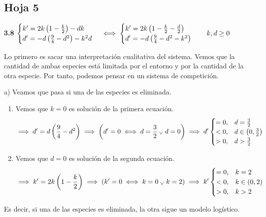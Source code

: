 \begin{center}
\end{center}

\subsection{Hoja 5}

\textbf{3.8} $\displaystyle \begin{cases}
		k' = 2k\left(1-\frac{k}{2}\right) - dk \\
		d' = -d\left(\frac{9}{4} - d^2\right) -k^2d
	\end{cases} \iff \begin{cases}
		k' = 2k\left(1-\frac{k}{2} - \frac{d}{2}\right) \\
		d' = -d\left(\frac{9}{4} - d^2 - k^2\right)
	\end{cases} \quad k,d \geq 0$

Lo primero es sacar una interpretación cualitativa del sistema. Vemos que la cantidad de ambas especies está limitada por el entorno y por la cantidad de la otra especie. Por tanto, podemos pensar en un sistema de competición.

a) Veamos que pasa si una de las especies es eliminada.
\begin{enumerate}
	\item Vemos que $k=0$ es solución de la primera ecuación.
	      \[\implies d'=d\left(\frac{9}{4} - d^2\right) \implies \left(d'= 0 \iff d = \frac{3}{2} \; _{\vee} \; d= 0\right) \implies d' \begin{cases}
			      = 0, & d = \frac{3}{2}                   \\
			      < 0, & d \in \left(0, \frac{3}{2}\right) \\
			      > 0, & d > \frac{3}{2}
		      \end{cases}\]
	\item Vemos que $d=0$ es solución de la segunda ecuación.
	      \[\implies k' = 2k\left(1-\frac{k}{2}\right) \implies \left(k'=0 \iff k = 0 \; _{\vee} \; k = 2\right) \implies k' \begin{cases}
			      = 0, & k = 2                   \\
			      < 0, & k \in \left(0, 2\right) \\
			      > 0, & k > 2
		      \end{cases}\]
\end{enumerate}
Es decir, si una de las especies es eliminada, la otra sigue un modelo logístico.

